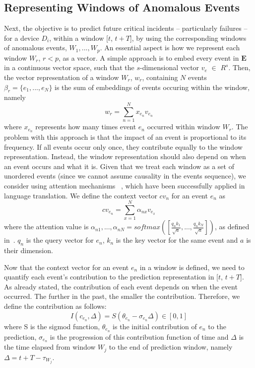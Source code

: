 \documentclass[letterpaper]{article} %
\begin{document}
\subsection{Representing Windows of Anomalous Events}
Next, the objective is to predict future critical incidents -- particularly failures -- for a device $D_{i}$, within a window [$t$, $t + T$], by using the corresponding windows of anomalous events, $W_{1}, ..., W_{p}$. An essential aspect is how we represent each window $W_{r}$, $r < p$, as a vector. A simple approach is to embed every event in $\mathbf{E}$ in a continuous vector space, such that the $s$-dimensional vector $v_{e}$ $\in$ $R^{s}$. Then, the vector representation of a window $W_{r}$, $w_{r}$, containing $N$ events $\beta_{r} = \{e_{1}, ..., e_{N}\}$ is the sum of embeddings of events occuring within the window, namely
\begin{equation}
w_{r} = \sum_{n=1}^{N} x_{e_{n}} v_{e_{n}}
\end{equation}
\noindent where $x_{e_{n}}$ represents how many times event $e_{n}$ occurred within window $W_{r}$. The problem with this approach is that the impact of an event is proportional to its frequency. If all events occur only once, they contribute equally to the window representation. Instead, the window representation should also depend on when an event occurs and what it is. Given that we treat each window as a set of unordered events (since we cannot assume causality in the events sequence), we consider using attention mechanisms
~\cite{attention}, which have been successfully applied in language translation. We define the context vector $cv_{n}$ for an event $e_{n}$ as
\begin{equation}
cv_{e_{n}} = \sum_{x=1}^{N} {\alpha}_{nx} v_{e_{x}}
\end{equation}
\noindent where the attention value is $\alpha_{n1}, ..., \alpha_{nN} = softmax([\frac{q_{n}k_{1}}{\sqrt{a}}, ..., \frac{q_{n}k_{N}}{\sqrt{a}}])$, as defined in~\cite{disease}. $q_{n}$ is the query vector for $e_{n}$, $k_{n}$ is the key vector for the same event and $a$ is their dimension.

Now that the context vector for an event $e_{n}$ in a window is defined, we need to quantify each event's contribution to the prediction representation in [$t$, $t + T$]. As already stated, the contribution of each event depends on when the event occurred. The further in the past, the smaller the contribution. Therefore, we define the contribution as follows:
\begin{equation}
I(c_{e{_n}}, \Delta) = S(\theta_{e_{n}} - \sigma_{e_{n}}\Delta) \in [0,1]
\end{equation}
\noindent where S is the sigmod function, $\theta_{e_{n}}$ is the initial contribution of $e_{n}$ to the prediction, $\sigma_{e_{n}}$ is the progression of this contribution function of time and $\Delta$ is the time elapsed from window $W_{j}$ to the end of prediction window, namely $\Delta = t + T - \tau_{W_{j}}$.
\end{document}
